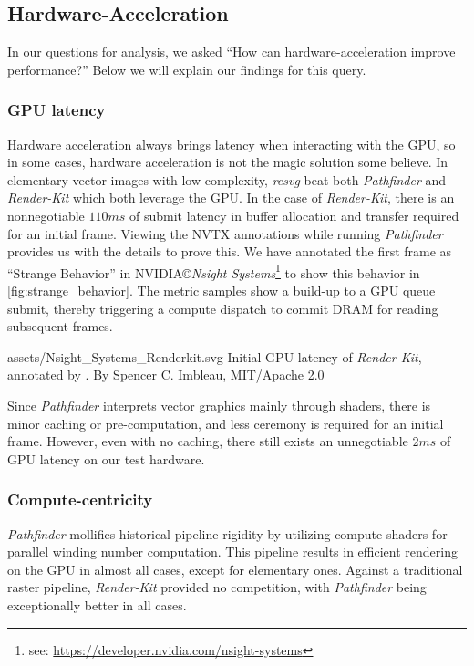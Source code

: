 \subsection{Hardware-Acceleration}
In our questions for analysis, we asked ``How can hardware-acceleration improve performance?'' Below we will explain our findings for this query.\medskip

\subsubsection{GPU latency} Hardware acceleration always brings latency when interacting with the GPU, so in some cases, hardware acceleration is not the magic solution some believe. In elementary vector images with low complexity, \textit{resvg} beat both \textit{Pathfinder} and \textit{Render-Kit} which both leverage the GPU. In the case of \textit{Render-Kit}, there is an nonnegotiable \(110ms\) of submit latency in buffer allocation and transfer required for an initial frame. Viewing the NVTX annotations while running \textit{Pathfinder} provides us with the details to prove this. We have annotated the first frame as ``Strange Behavior'' in NVIDIA\copyright \textit{Nsight Systems}\footnote{see: \href{https://developer.nvidia.com/nsight-systems}{https://developer.nvidia.com/nsight-systems}} to show this behavior in \cref{fig:strange_behavior}. The metric samples show a build-up to a GPU queue submit, thereby triggering a compute dispatch to commit DRAM for reading subsequent frames.\medskip

\widesvg
{assets/Nsight_Systems_Renderkit.svg}
{Initial GPU latency of \textit{Render-Kit}, annotated by \toolname.\label{fig:strange_behavior}}
{By Spencer C. Imbleau, MIT/Apache 2.0}
\medskip

Since \textit{Pathfinder} interprets vector graphics mainly through shaders, there is minor caching or pre-computation, and less ceremony is required for an initial frame. However, even with no caching, there still exists an unnegotiable \(2ms\) of GPU latency on our test hardware.

\subsubsection{Compute-centricity} \textit{Pathfinder} mollifies historical pipeline rigidity by utilizing compute shaders for parallel winding number computation. This pipeline results in efficient rendering on the GPU in almost all cases, except for elementary ones. Against a traditional raster pipeline, \textit{Render-Kit} provided no competition, with \textit{Pathfinder} being exceptionally better in all cases.\medskip

